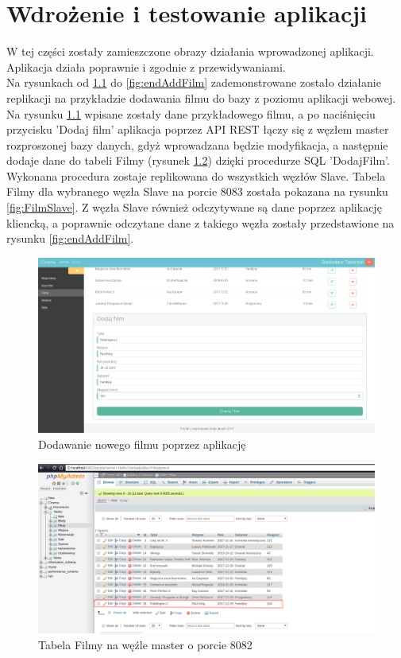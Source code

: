 \chapter{Wdrożenie i testowanie aplikacji}

W tej części zostały zamieszczone obrazy działania wprowadzonej aplikacji. Aplikacja działa
poprawnie i zgodnie z przewidywaniami. \\

Na rysunkach od \ref{fig:addFilm} do \ref{fig:endAddFilm} zademonstrowane zostało działanie replikacji na przykładzie dodawania filmu do bazy z poziomu aplikacji webowej.\\

Na rysunku \ref{fig:addFilm} wpisane zostały dane przykładowego filmu, a po naciśnięciu przycisku 'Dodaj film' aplikacja poprzez API REST łączy się z węzłem master rozproszonej bazy danych, gdyż wprowadzana będzie modyfikacja, a następnie dodaje dane do tabeli Filmy (rysunek \ref{fig:FilmMaster}) dzięki procedurze SQL 'DodajFilm'. Wykonana procedura zostaje replikowana do wszystkich węzłów Slave. Tabela Filmy dla wybranego węzła Slave na porcie 8083 została pokazana na rysunku \ref{fig:FilmSlave}. Z węzła Slave również odczytywane są dane poprzez aplikację kliencką, a poprawnie odczytane dane z takiego węzła zostały przedstawione na rysunku \ref{fig:endAddFilm}.

\begin{figure} [H]
	\centering
	\includegraphics[width=1\linewidth]{rozdzial06/5.png}
	\caption{Dodawanie nowego filmu poprzez aplikację}
	\label{fig:addFilm}
\end{figure}

\begin{figure} [H]
	\centering
	\includegraphics[width=1\linewidth]{rozdzial06/7.png}
	\caption{Tabela Filmy na węźle master o porcie 8082}
	\label{fig:FilmMaster}
\end{figure}

